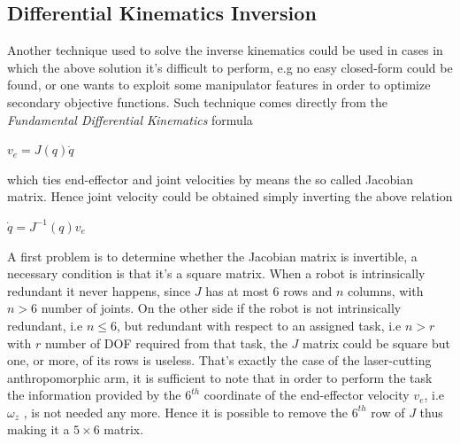 \subsection{Differential Kinematics Inversion}
\label{ss:dki}
Another technique used to solve the inverse kinematics could be used in cases in which the above solution it's difficult to perform, e.g no easy closed-form could be found, or one wants to exploit some manipulator features in order to optimize secondary objective functions. Such technique comes directly from the \textit{Fundamental Differential Kinematics} formula
\begin{center}
	$v_e  = J(q)\dot{q}$
\end{center}
which ties end-effector and joint velocities by means the so called Jacobian matrix. Hence joint velocity could be obtained simply inverting the above relation
\begin{center}
	$\dot{q} = J^{-1}(q)v_e$
\end{center}
A first problem is to determine whether the Jacobian matrix is invertible, a necessary condition is that it's a square matrix. When a robot is intrinsically redundant it never happens, since $J$ has at most 6 rows and $n$ columns, with $n>6$ number of joints. On the other side if the robot is not intrinsically redundant, i.e $n\leqslant6$, but redundant with respect to an assigned task, i.e $n > r$ with $r$ number of DOF required from that task, the $J$ matrix could be square but one, or more, of its rows is useless. That's exactly the case of the laser-cutting anthropomorphic arm, it is sufficient to note that in order to perform the task the information provided by the $6^{th}$ coordinate of the end-effector velocity $v_e$, i.e $\omega_z$ , is not needed any more. Hence it is possible to remove the $6^{th}$ row of $J$ thus making it a $5\times6$ matrix.

